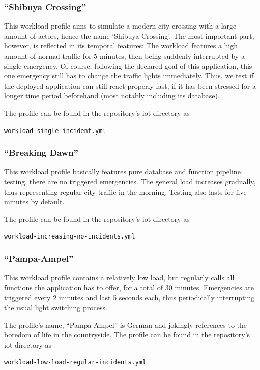 \documentclass[../main.tex]{subfiles}
\begin{document}
\subsubsection{``Shibuya Crossing''}%
\label{ssub:iotShibuya}

This workload profile aims to simulate a modern city crossing with a large amount of actors,
hence the name `Shibuya Crossing'.
The most important part, however, is reflected in its temporal features:
The workload features a high amount of normal traffic for 5 minutes,
then being suddenly interrupted by a single emergency.
Of course, following the declared goal of this application, this one emergency still has to change the traffic lights immediately.
Thus, we test if the deployed application can still react properly fast, 
if it has been stressed for a longer time period beforehand (most notably including its database).

The profile can be found in the repository's iot directory as 
\begin{tcolorbox}
\quad\texttt{workload-single-incident.yml}
\end{tcolorbox}

\subsubsection{``Breaking Dawn''}%
\label{ssub:iotDawn}

This workload profile basically features pure database and function pipeline testing, there are no triggered emergencies.
The general load increases gradually, thus representing regular city traffic in the morning.
Testing also lasts for five minutes by default.

The profile can be found in the repository's iot directory as 
\begin{tcolorbox}
\quad\texttt{workload-increasing-no-incidents.yml}
\end{tcolorbox}

\subsubsection{``Pampa-Ampel''}%
\label{ssub:iotPampaAmpel}

This workload profile contains a relatively low load, but regularly calls all functions the application has to offer,
for a total of 30 minutes.
Emergencies are triggered every 2 minutes and last 5 seconds each, 
thus periodically interrupting the usual light switching process.

The profile's name, ``Pampa-Ampel'' is German and jokingly references to the boredom of life in the countryside.
The profile can be found in the repository's iot directory as 
\begin{tcolorbox}
\quad\texttt{workload-low-load-regular-incidents.yml}
\end{tcolorbox}
\end{document}
